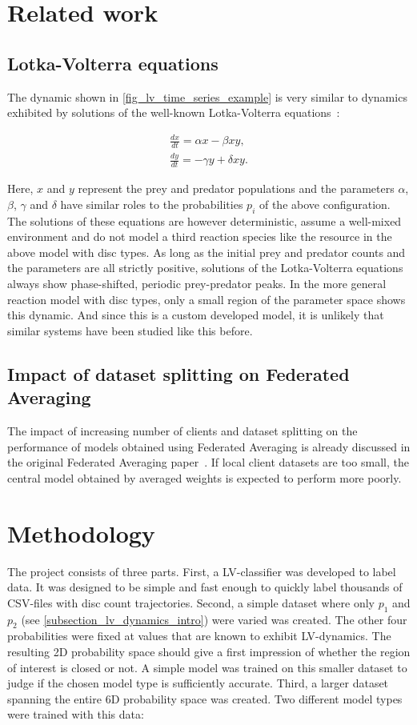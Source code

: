 \documentclass[a4paper]{scrartcl}
\begin{document}
\section{Related work}
\subsection{Lotka-Volterra equations}
\label{subsection_lv_dynamics_related}
The dynamic shown in \cref{fig_lv_time_series_example} is very similar to dynamics exhibited by solutions of the well-known Lotka-Volterra equations~\cite{wikipedia_lv_equations}:

\begin{align*}
    \frac{dx}{dt} = \alpha x - \beta xy,\\
    \frac{dy}{dt} = -\gamma y + \delta xy.
\end{align*}

Here, $x$ and $y$ represent the prey and predator populations and the parameters $\alpha$, $\beta$, $\gamma$ and $\delta$ have similar roles to the probabilities $p_i$ of the above configuration. The solutions of these equations are however deterministic, assume a well-mixed environment and do not model a third reaction species like the resource in the above model with disc types. As long as the initial prey and predator counts and the parameters are all strictly positive, solutions of the Lotka-Volterra equations always show phase-shifted, periodic prey-predator peaks. In the more general reaction model with disc types, only a small region of the parameter space shows this dynamic. And since this is a custom developed model, it is unlikely that similar systems have been studied like this before.

\subsection{Impact of dataset splitting on Federated Averaging}
The impact of increasing number of clients and dataset splitting on the performance of models obtained using Federated Averaging is already discussed in the original Federated Averaging paper~\cite{McMahan2017}. If local client datasets are too small, the central model obtained by averaged weights is expected to perform more poorly.

\section{Methodology}
The project consists of three parts. First, a LV-classifier was developed to label data. It was designed to be simple and fast enough to quickly label thousands of CSV-files with disc count trajectories. Second, a simple dataset where only $p_1$ and $p_2$ (see \cref{subsection_lv_dynamics_intro}) were varied was created. The other four probabilities were fixed at values that are known to exhibit LV-dynamics. The resulting 2D probability space should give a first impression of whether the region of interest is closed or not. A simple model was trained on this smaller dataset to judge if the chosen model type is sufficiently accurate. Third, a larger dataset spanning the entire 6D probability space was created. Two different model types were trained with this data:
\end{document}
